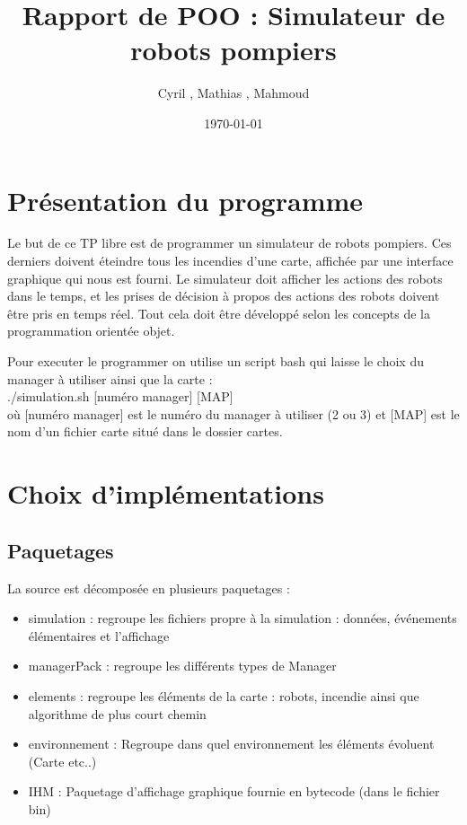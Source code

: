 \documentclass[a4paper,11pt]{article}
\title{Rapport de POO : Simulateur de robots pompiers}
\author{Cyril \bsc{Dutrieux}, Mathias \bsc{Biehler},  Mahmoud \bsc{Bentriou}}
\date{\today}
\begin{document}

\maketitle

\tableofcontents

\newpage

\section{Présentation du programme}

Le but de ce TP libre est de programmer un simulateur de robots pompiers. Ces derniers doivent éteindre tous les incendies d'une carte, affichée par une interface graphique qui nous est fourni. Le simulateur doit afficher les actions des robots dans le temps, et les prises de décision à propos des actions des robots doivent être pris en temps réel. Tout cela doit être développé selon les concepts de la programmation orientée objet.

Pour executer le programmer on utilise un script bash qui laisse le choix du manager à utiliser ainsi que la carte : \\
./simulation.sh [numéro manager] [MAP] \\
où [numéro manager] est le numéro du manager à utiliser (2 ou 3) et [MAP] est le nom d'un fichier carte situé dans le dossier cartes.

\section{Choix d'implémentations}

\subsection{Paquetages}

La source est décomposée en plusieurs paquetages :
\begin{itemize}
\item simulation : regroupe les fichiers propre à la simulation : données, événements élémentaires et l'affichage
\item managerPack : regroupe les différents types de Manager 
\item elements : regroupe les éléments de la carte : robots, incendie ainsi que  algorithme de plus court chemin
\item environnement : Regroupe dans quel environnement les éléments évoluent (Carte etc..)
\item IHM : Paquetage d'affichage graphique fournie en bytecode (dans le fichier bin)
\end{itemize}
\end{document}
